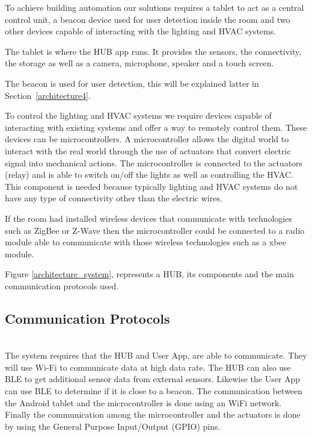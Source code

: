To achieve building automation our solutions requires a tablet to act as a central control unit, a beacon device used for user detection inside the room and two other devices capable of interacting with the lighting and \ac{HVAC} systems.

The tablet is where the HUB app runs. It provides the sensors, the connectivity, the storage as well as a camera, microphone, speaker and a touch screen. 

The beacon is used for user detection, this will be explained latter in Section~\ref{architecture4}.

To control the lighting and \ac{HVAC} systems we require devices capable of interacting with existing systems and offer a way to remotely control them. These devices can be microcontrollers. A microcontroller allows the digital world to interact with the real world through the use of actuators that convert electric signal into mechanical actions. The microcontroller is connected to the actuators (relay) and is able to switch on/off the lights as well as controlling the HVAC. This component is needed because typically lighting and HVAC systems do not have any type of connectivity other than the electric wires. 


If the room had installed wireless devices that communicate with technologies such as ZigBee or Z-Wave then the microcontroller could be connected to a radio module able to communicate with those wireless technologies such as a xbee module.


Figure \ref{architecture_system}, represents a HUB, its components and the main communication protocols used.

 

\subsection{Communication Protocols}\mbox{}\\

The system requires that the HUB and User App, are able to communicate. They will use Wi-Fi to communicate data at high data rate. The HUB can also use \ac{BLE} to get additional sensor data from external sensors. Likewise the User App can use \ac{BLE} to determine if it is close to a beacon. The communication between the Android tablet and the microcontroller is done using an WiFi network. Finally the communication among the microcontroller and the actuators is done by using the General Purpose Input/Output (GPIO) pins.




